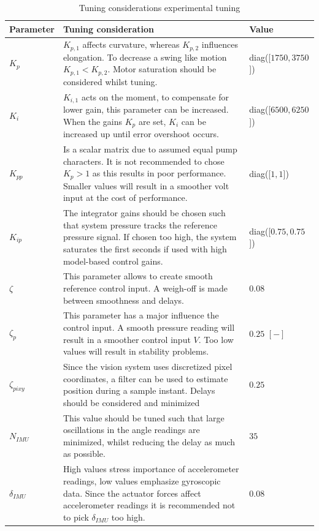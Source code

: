 \begin{table}[H]
    \centering
     \caption{Tuning considerations experimental tuning}
    \begin{tabular}{p{2.5cm} p{9cm} p{3cm}} \hline
      \textbf{Parameter}   & \textbf{Tuning  consideration} & \textbf{Value } \\ \hline
      $K_p$   &   $K_{p,1}$ affects curvature, whereas $K_{p,2}$ influences elongation. To decrease a swing like motion $K_{p,1} < K_{p,2}$. Motor saturation should be considered whilst tuning.   &  diag([$1750,3750$])            \\ \hline
      $K_i$   &   $K_{i,1}$ acts on the moment, to compensate for lower gain, this parameter can be increased. When the gains $K_p$ are set, $K_i$ can be increased up until error overshoot occurs.   &  diag([$6500,6250$])    \\ \hline
      $K_{pp}$   &  Is a scalar matrix due to assumed equal pump characters. It is not recommended to chose $K_p >1$ as this results in poor performance. Smaller values will result in a smoother volt input at the cost of performance.  &  diag([$1 ,1$])     \\ \hline
      $K_{ip}$   &  The integrator gains should be chosen such that system pressure tracks the reference pressure signal. If chosen too high, the system saturates the first seconds if used with high model-based control gains.    &  diag([$0.75,0.75$])    \\ \hline
      $\zeta$    &   This parameter allows to create smooth reference control input. A weigh-off is made between smoothness and delays. &  $0.08$  \\ \hline
      $\zeta_p$    &   This parameter has a major influence the control input. A smooth pressure reading will result in a smoother control input $V$. Too low values will result in stability problems.   & $0.25$ $[-]$  \\ \hline
      $\zeta_{pixy}$    &  Since the vision system uses discretized pixel coordinates, a filter can be used to estimate position during a sample instant. Delays should be considered and minimized     & $0.25$   \\ \hline
      $N_{IMU}$    &  This value should be tuned such that large oscillations in the angle readings are minimized, whilst reducing the delay as much as possible. & $35$   \\ \hline
      $\delta_{IMU}$    &  High values stress importance of accelerometer readings, low values emphasize gyroscopic data. Since the actuator forces affect accelerometer readings it is recommended not to pick $\delta_{IMU}$ too high.  & $0.08$  \\ \hline
    \end{tabular}
    \label{tab5:tuningcosiderations}
\end{table}



